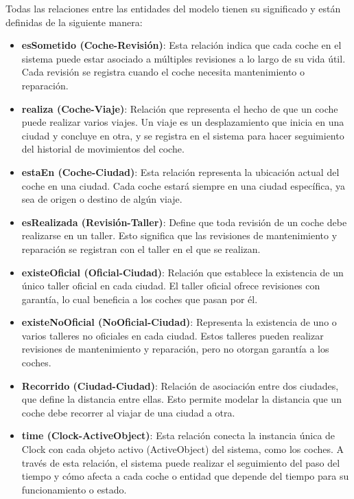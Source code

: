 \documentclass[12pt.a4paper]{article}
\begin{document}
Todas las relaciones entre las entidades del modelo tienen su significado y están definidas de la siguiente manera:
\begin{itemize}
\item \textbf{esSometido (Coche-Revisión)}:  Esta relación indica que cada coche en el sistema puede estar asociado a múltiples revisiones a lo largo de su vida útil. Cada revisión se registra cuando el coche necesita mantenimiento o reparación.
  
\item \textbf{realiza (Coche-Viaje)}: Relación que representa el hecho de que un coche puede realizar varios viajes. Un viaje es un desplazamiento que inicia en una ciudad y concluye en otra, y se registra en el sistema para hacer seguimiento del historial de movimientos del coche.

\item \textbf{estaEn (Coche-Ciudad)}: Esta relación representa la ubicación actual del coche en una ciudad. Cada coche estará siempre en una ciudad específica, ya sea de origen o destino de algún viaje.

\item \textbf{esRealizada (Revisión-Taller)}: Define que toda revisión de un coche debe realizarse en un taller. Esto significa que las revisiones de mantenimiento y reparación se registran con el taller en el que se realizan.

\item \textbf{existeOficial (Oficial-Ciudad)}: Relación que establece la existencia de un único taller oficial en cada ciudad. El taller oficial ofrece revisiones con garantía, lo cual beneficia a los coches que pasan por él.

\item \textbf{existeNoOficial (NoOficial-Ciudad)}: Representa la existencia de uno o varios talleres no oficiales en cada ciudad. Estos talleres pueden realizar revisiones de mantenimiento y reparación, pero no otorgan garantía a los coches.

\item \textbf{Recorrido (Ciudad-Ciudad)}: Relación de asociación entre dos ciudades, que define la distancia entre ellas. Esto permite modelar la distancia que un coche debe recorrer al viajar de una ciudad a otra.

\item \textbf{time (Clock-ActiveObject)}: Esta relación conecta la instancia única de Clock con cada objeto activo (ActiveObject) del sistema, como los coches. A través de esta relación, el sistema puede realizar el seguimiento del paso del tiempo y cómo afecta a cada coche o entidad que depende del tiempo para su funcionamiento o estado.
\end{itemize}
\end{document}
